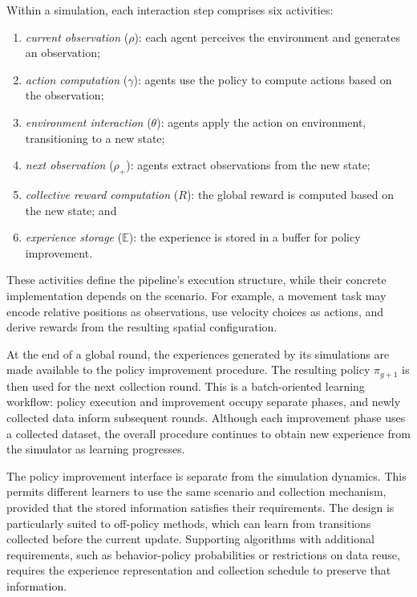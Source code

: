 Within a simulation, each interaction step comprises six activities:
\begin{enumerate}
    \item \emph{current observation} ($\rho$): each agent perceives the environment and generates an observation;
    \item \emph{action computation} ($\gamma$): agents use the policy to compute actions based on the observation;
    \item \emph{environment interaction} ($\theta$): agents apply the action on environment, transitioning to a new state;
    \item \emph{next observation} ($\rho_\mathcal{+}$): agents extract observations from the new state;
    \item \emph{collective reward computation} ($R$): the global reward is computed based on the new state;
    and
    \item \emph{experience storage} ($\mathbb{E}$): the experience is stored in a buffer for policy improvement.
\end{enumerate}
These activities define the pipeline's execution structure, while their
 concrete implementation depends on the scenario.
%
For example, a movement task may encode relative positions as observations,
 use velocity choices as actions, and derive rewards from the resulting
 spatial configuration.

At the end of a global round, the experiences generated by its simulations
 are made available to the policy improvement procedure.
%
The resulting policy $\pi_{g+1}$ is then used for the next collection round.
%
This is a batch-oriented learning workflow: policy execution and improvement
 occupy separate phases, and newly collected data inform subsequent rounds.
%
Although each improvement phase uses a collected dataset, the overall
 procedure continues to obtain new experience from the simulator as
 learning progresses.

The policy improvement interface is separate from the simulation dynamics.
%
This permits different learners to use the same scenario and collection
 mechanism, provided that the stored information satisfies their requirements.
%
The design is particularly suited to off-policy methods, which can learn
 from transitions collected before the current update.
%
Supporting algorithms with additional requirements, such as behavior-policy
 probabilities or restrictions on data reuse, requires the experience
 representation and collection schedule to preserve that information.

